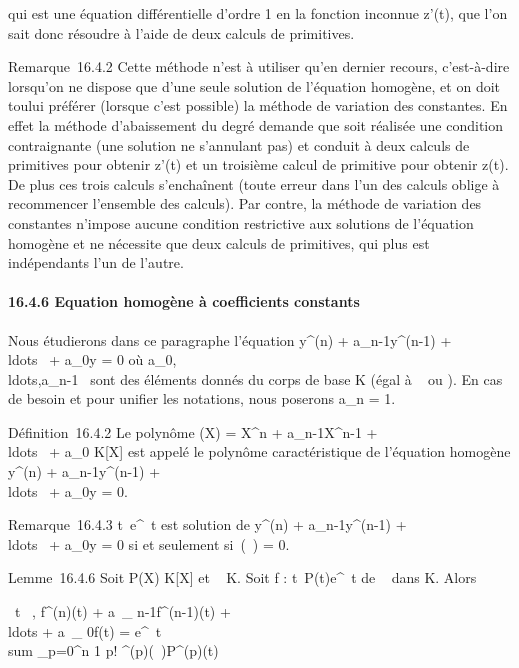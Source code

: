 \documentclass[]{article}
\begin{document}
qui est une équation différentielle d'ordre 1 en la fonction inconnue
z'(t), que l'on sait donc résoudre à l'aide de deux calculs de
primitives.

Remarque~16.4.2 Cette méthode n'est à utiliser qu'en dernier recours,
c'est-à-dire lorsqu'on ne dispose que d'une seule solution de l'équation
homogène, et on doit tou\jmathours lui préférer (lorsque c'est possible) la
méthode de variation des constantes. En effet la méthode d'abaissement
du degré demande que soit réalisée une condition contraignante (une
solution ne s'annulant pas) et conduit à deux calculs de primitives pour
obtenir z'(t) et un troisième calcul de primitive pour obtenir z(t). De
plus ces trois calculs s'enchaînent (toute erreur dans l'un des calculs
oblige à recommencer l'ensemble des calculs). Par contre, la méthode de
variation des constantes n'impose aucune condition restrictive aux
solutions de l'équation homogène et ne nécessite que deux calculs de
primitives, qui plus est indépendants l'un de l'autre.

\paragraph{16.4.6 Equation homogène à coefficients constants}

Nous étudierons dans ce paragraphe l'équation y^(n) +
a\_n-1y^(n-1) +
\\ldots~ +
a\_0y = 0 où
a\_0,\\ldots,a\_n-1~
sont des éléments donnés du corps de base K (égal à ~ ou ). En cas de
besoin et pour unifier les notations, nous poserons a\_n = 1.

Définition~16.4.2 Le polynôme \chi(X) = X^n +
a\_n-1X^n-1 +
\\ldots~ +
a\_0 \in K{[}X{]} est appelé le polynôme caractéristique de
l'équation homogène y^(n) + a\_n-1y^(n-1)
+ \\ldots~ +
a\_0y = 0.

Remarque~16.4.3 t\mapsto~e^\lambda~t est
solution de y^(n) + a\_n-1y^(n-1) +
\\ldots~ +
a\_0y = 0 si et seulement si~\chi(\lambda~) = 0.

Lemme~16.4.6 Soit P(X) \in K{[}X{]} et \lambda~ \in K. Soit f :
t\mapsto~P(t)e^\lambda~t de ~ dans K. Alors

\forall~t \in {}~, f^(n)(t) + a~\_
n-1f^(n-1)(t) +
\\ldots + a~\_
0f(t) = e^\lambda~t \\sum
\_p=0^n 1 \over p!
\chi^(p)(\lambda~)P^(p)(t)
\end{document}
